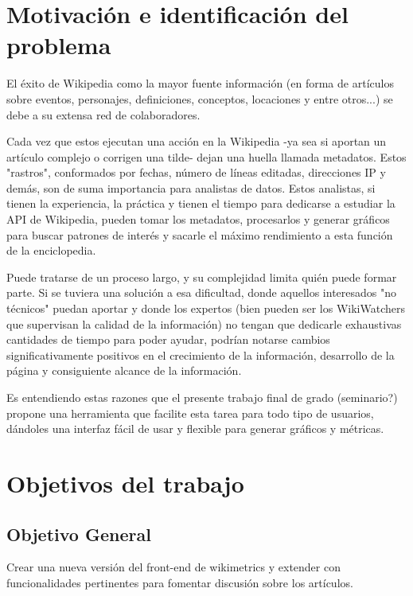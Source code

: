


\section{Motivación e identificación del problema}

El éxito de Wikipedia como la mayor fuente información (en forma de artículos sobre eventos, personajes, definiciones, conceptos, locaciones y entre otros...) se debe a su extensa red de colaboradores.

Cada vez que estos ejecutan una acción en la Wikipedia -ya sea si aportan un artículo complejo o corrigen una tilde- dejan una huella llamada metadatos. Estos "rastros", conformados por fechas, número de líneas editadas, direcciones IP y demás, son de suma importancia para analistas de datos. Estos analistas, si tienen la experiencia, la práctica y tienen el tiempo para dedicarse a estudiar la API de Wikipedia, pueden tomar los metadatos, procesarlos y generar gráficos para buscar patrones de interés y sacarle el máximo rendimiento a esta función de la enciclopedia.

Puede tratarse de un proceso largo, y su complejidad limita quién puede formar parte. Si se tuviera una solución a esa dificultad, donde aquellos interesados "no técnicos" puedan aportar y donde los expertos (bien pueden ser los WikiWatchers que supervisan la calidad de la información) no tengan que dedicarle exhaustivas cantidades de tiempo para poder ayudar, podrían notarse cambios significativamente positivos en el crecimiento de la información, desarrollo de la página y consiguiente alcance de la información.

Es entendiendo estas razones que el presente trabajo final de grado (seminario?) propone una herramienta que facilite esta tarea para todo tipo de usuarios, dándoles una interfaz fácil de usar y flexible para generar gráficos y métricas.

\section{Objetivos del trabajo}

\subsection{Objetivo General}
Crear una nueva versión del front-end de wikimetrics y extender con funcionalidades pertinentes para fomentar discusión sobre los artículos.

